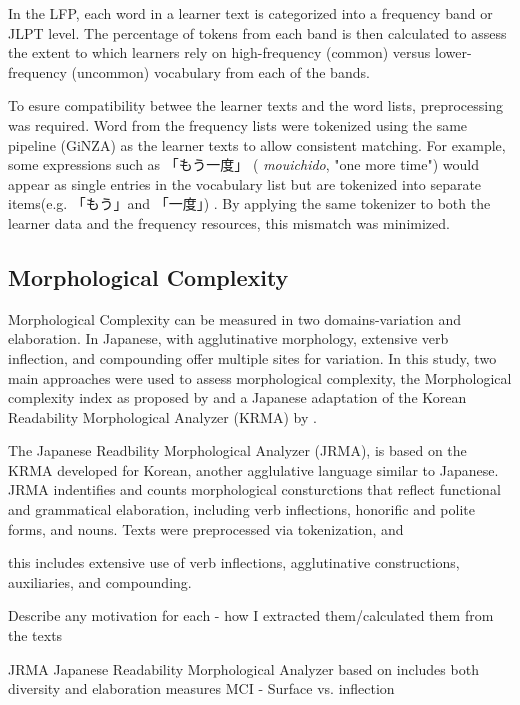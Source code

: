 In the LFP, each word in a learner text is categorized into a frequency band or JLPT level. The percentage of tokens
from each band is then calculated to assess the extent to which learners rely on high-frequency (common) versus
lower-frequency (uncommon) vocabulary  from
each of the bands.

To esure compatibility betwee the learner texts and the word lists, preprocessing was required. Word from the
frequency lists were tokenized using the same pipeline (GiNZA) as the learner texts to allow consistent matching.
 For example, some expressions such as
「もう一度」 (
\textit{mouichido}, "one more time") would appear as single entries in the vocabulary list but are tokenized
into separate
items(e.g. 「もう」and 「一度」) . By applying the same tokenizer to both the learner data and the frequency resources, this
mismatch was minimized.


\subsection{Morphological Complexity}
Morphological Complexity can be measured in two domains-variation and elaboration. In Japanese, with agglutinative
morphology, extensive verb inflection, and compounding offer multiple sites for variation.  In this study, two main
approaches were used to assess morphological complexity, the Morphological complexity index as proposed by
\citet{Brezina2019} and a Japanese adaptation of the Korean Readability Morphological Analyzer (KRMA) by
\citet{Hwang2024}.

The Japanese Readbility Morphological Analyzer (JRMA), is based on the KRMA developed for Korean, another
agglulative language similar to Japanese. JRMA indentifies and counts morphological consturctions that reflect
functional and grammatical elaboration, including verb inflections, honorific and polite forms, and nouns. Texts
were preprocessed via tokenization, and


this includes
extensive use of verb inflections, agglutinative constructions, auxiliaries, and compounding.

Describe any motivation for each - how I extracted them/calculated them from the texts

JRMA Japanese Readability Morphological Analyzer based on \citet{Hwang2024}  includes both diversity and
elaboration measures
MCI \citet{Brezina2019} - Surface vs. inflection

